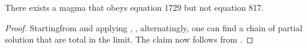\begin{theorem}\label{1729_refute_817} There exists a magma that obeys equation 1729 but not equation 817.
\end{theorem}

\begin{proof}
  Startingfrom  and applying , ,  alternatingly, one can find a chain of partial solution that are total in the limit.  The claim now follows from .
\end{proof}
